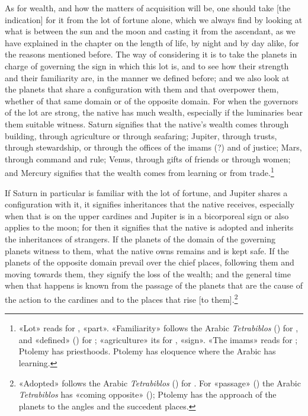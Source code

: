 \documentclass[11pt]{article}
\newcommand{\Fol}[1]{\marginpar{\footnotesize\color{gray}f.\,#1}}
\begin{document}
\par \Fol{63v}As for wealth, and how the matters of acquisition will be, one should take [the indication] for it from the lot of fortune alone, which we always find by looking at what is between the sun and the moon and casting it from the ascendant, as we have explained in the chapter on the length of life, by night and by day alike, for the reasons mentioned before. The way of considering it is to take the planets in charge of governing the sign in which this lot is, and to see how their strength and their familiarity are, in the manner we defined before; and we also look at the planets that share a configuration with them and that overpower them, whether of that same domain or of the opposite domain. For when the governors of the lot are strong, the native has much wealth, especially if the luminaries bear them suitable witness. Saturn signifies that the native's wealth comes through building, through agriculture or through seafaring; Jupiter, through trusts, through stewardship, or through the offices of the imams (?) and of justice; Mars, through command and rule; Venus, through gifts of friends or through women; and Mercury signifies that the wealth comes from learning or from trade.\footnote{«Lot» reads  for , «part». «Familiarity» follows the Arabic \emph{Tetrabiblos} () for , and «defined» () for ; «agriculture» its  for , «sign». «The imams» reads  for ; Ptolemy has priesthoods. Ptolemy has eloquence where the Arabic has learning.}\par
\par If Saturn in particular is familiar with the lot of fortune, and Jupiter shares a configuration with it, it signifies inheritances that the native receives, especially when that is on the upper cardines and Jupiter is in a bicorporeal sign or also applies to the moon; for then it signifies that the native is adopted and inherits the inheritances of strangers. If the planets of the domain of the governing planets witness to them, what the native owns remains and is kept safe. If the planets of the opposite domain prevail over the chief places, following them and moving towards them, they signify the loss of the wealth; and the general time when that happens is known from the passage of the planets that are the cause of the action to the cardines and to the places that rise [to them].\footnote{«Adopted» follows the Arabic \emph{Tetrabiblos} () for . For «passage» () the Arabic \emph{Tetrabiblos} has «coming opposite» (); Ptolemy has the approach of the planets to the angles and the succedent places.}\par
\end{document}
